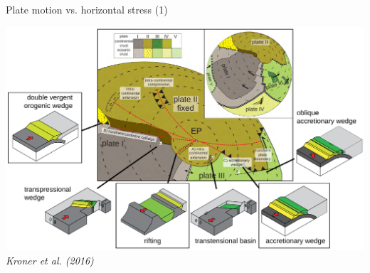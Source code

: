 \documentclass[10pt,xcolor=dvipsnames, aspectratio=169]{beamer}
\begin{document}
\begin{frame}{Plate motion vs. horizontal stress (1)}
\begin{minipage}[c][200pt][c]{.58\linewidth}
{        \includegraphics[width=\linewidth]{kroner2016.pdf}\\%
        \tiny\textit{Kroner et al. (2016)}
        }
    \end{minipage}    
	\end{frame}	
	
\end{document}
